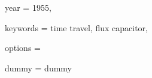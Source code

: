 {  %
  
  year      = {1955},
  
  
  keywords  = {time travel, flux capacitor},
  
  
  
  
  
  
  
  
  
  options   = {
     
     
     
     
     
     dummy = {dummy}
  }
}
\papershellapply